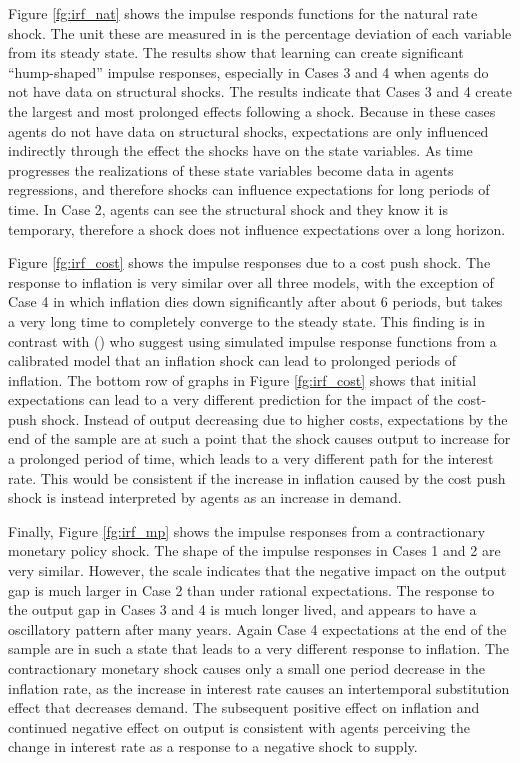 \documentclass[11pt]{article}
\newcommand{\citee}[1]{\citeauthor*{#1} (\citeyear{#1})}
\begin{document}
Figure \ref{fg:irf_nat} shows the impulse responds functions for the natural rate shock.  The unit these are measured in is the percentage deviation of each variable from its steady state.  The results show that learning can create significant ``hump-shaped'' impulse responses, especially in Cases 3 and 4 when agents do not have data on structural shocks.  The results indicate that Cases 3 and 4 create the largest and most prolonged effects following a shock.  Because in these cases agents do not have data on structural shocks, expectations are only influenced indirectly through the effect the shocks have on the state variables.  As time progresses the realizations of these state variables become data in agents regressions, and therefore shocks can influence expectations for long periods of time.  In Case 2, agents can see the structural shock and they know it is temporary, therefore a shock does not influence expectations over a long horizon.

Figure \ref{fg:irf_cost} shows the impulse responses due to a cost push shock.  The response to inflation is very similar over all three models, with the exception of Case 4 in which inflation dies down significantly after about 6 periods, but takes a very long time to completely converge to the steady state.  This finding is in contrast with \citee{ow2005} who suggest using simulated impulse response functions from a calibrated model that an inflation shock can lead to prolonged periods of inflation.  The bottom row of graphs in Figure \ref{fg:irf_cost} shows that initial expectations can lead to a very different prediction for the impact of the cost-push shock.  Instead of output decreasing due to higher costs, expectations by the end of the sample are at such a point that the shock causes output to increase for a prolonged period of time, which leads to a very different path for the interest rate.  This would be consistent if the increase in inflation caused by the cost push shock is instead interpreted by agents as an increase in demand.

Finally, Figure \ref{fg:irf_mp} shows the impulse responses from a contractionary monetary policy shock.  The shape of the impulse responses in Cases 1 and 2 are very similar.  However, the scale indicates that the negative impact on the output gap is much larger in Case 2 than under rational expectations.  The response to the output gap in Cases 3 and 4 is much longer lived, and appears to have a oscillatory pattern after many years.  Again Case 4 expectations at the end of the sample are in such a state that leads to a very different response to inflation.  The contractionary monetary shock causes only a small one period decrease in the inflation rate, as the increase in interest rate causes an intertemporal substitution effect that decreases demand.  The subsequent positive effect on inflation and continued negative effect on output is consistent with agents perceiving the change in interest rate as a response to a negative shock to supply.  
\end{document}
